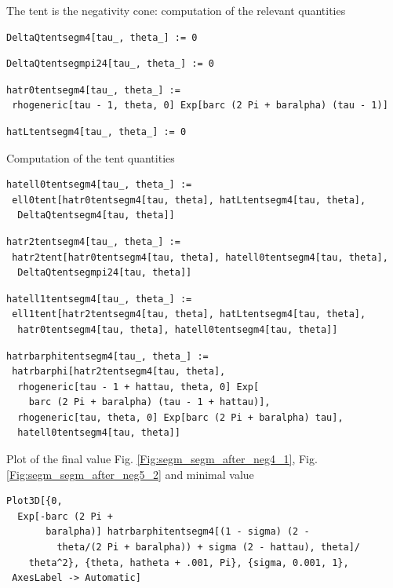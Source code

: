 \documentclass[reqno]{amsart}
\theoremstyle{definition} \newtheorem{definition}{Definition}[section]
\theoremstyle{definition} \newtheorem{remark}[definition]{Remark}
\theoremstyle{plain} \newtheorem{lemma}[definition]{Lemma}
\theoremstyle{plain} \newtheorem{proposition}[definition]{Proposition}
\theoremstyle{plain} \newtheorem{theorem}[definition]{Theorem}
\theoremstyle{plain} \newtheorem{corollary}[definition]{Corollary}
\theoremstyle{definition} \newtheorem{example}[definition]{Example}
\theoremstyle{plain} \newtheorem{claim}[clai]{Claim}
\theoremstyle{definition} \newtheorem{assumption}[definition]{Assumption}
\theoremstyle{definition} \newtheorem{observation}[definition]{Observation}
\newcommand{\1}{\mathbbm 1}
\newcommand{\smed}{\medskip}
\numberwithin{equation}{section} %
\theoremstyle{plain} \newtheorem*{theorem*}{Theorem}
\theoremstyle{plain} \newtheorem{mthm}[maintheorem]{Main Theorem}
\theoremstyle{plain} \newtheorem*{mthm*}{Main Theorem}
\theoremstyle{plain} \newtheorem*{conjecture*}{Conjecture}
\theoremstyle{plain} \newtheorem{conjecture}[definition]{Conjecture}
\theoremstyle{plain} \newtheorem*{problem*}{Problem}
\begin{document}
\noindent The tent is the negativity cone: computation of the relevant quantities
\smed
\begin{verbatim}
DeltaQtentsegm4[tau_, theta_] := 0
\end{verbatim}
\begin{verbatim}
DeltaQtentsegmpi24[tau_, theta_] := 0
\end{verbatim}
\begin{verbatim}
hatr0tentsegm4[tau_, theta_] := 
 rhogeneric[tau - 1, theta, 0] Exp[barc (2 Pi + baralpha) (tau - 1)]
\end{verbatim}
\begin{verbatim}
hatLtentsegm4[tau_, theta_] := 0
\end{verbatim}
\smed
Computation of the tent quantities
\smed
\begin{verbatim}
hatell0tentsegm4[tau_, theta_] := 
 ell0tent[hatr0tentsegm4[tau, theta], hatLtentsegm4[tau, theta], 
  DeltaQtentsegm4[tau, theta]]
\end{verbatim}
\begin{verbatim}
hatr2tentsegm4[tau_, theta_] := 
 hatr2tent[hatr0tentsegm4[tau, theta], hatell0tentsegm4[tau, theta], 
  DeltaQtentsegmpi24[tau, theta]]
\end{verbatim}
\begin{verbatim}
hatell1tentsegm4[tau_, theta_] := 
 ell1tent[hatr2tentsegm4[tau, theta], hatLtentsegm4[tau, theta], 
  hatr0tentsegm4[tau, theta], hatell0tentsegm4[tau, theta]]
\end{verbatim}
\begin{verbatim}
hatrbarphitentsegm4[tau_, theta_] := 
 hatrbarphi[hatr2tentsegm4[tau, theta], 
  rhogeneric[tau - 1 + hattau, theta, 0] Exp[
    barc (2 Pi + baralpha) (tau - 1 + hattau)], 
  rhogeneric[tau, theta, 0] Exp[barc (2 Pi + baralpha) tau], 
  hatell0tentsegm4[tau, theta]]
\end{verbatim}
\smed
Plot of the final value Fig. \ref{Fig:segm_segm_after_neg4_1}, Fig. \ref{Fig:segm_segm_after_neg5_2} and minimal value
\smed
\begin{verbatim}
Plot3D[{0, 
  Exp[-barc (2 Pi + 
       baralpha)] hatrbarphitentsegm4[(1 - sigma) (2 - 
         theta/(2 Pi + baralpha)) + sigma (2 - hattau), theta]/
    theta^2}, {theta, hatheta + .001, Pi}, {sigma, 0.001, 1}, 
 AxesLabel -> Automatic]
\end{verbatim}
\end{document}
